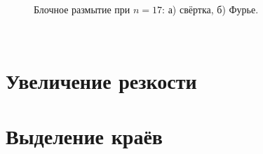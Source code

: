 \documentclass[a5paper, 10pt]{article}
\theoremstyle{definition}
\theoremstyle{plain}
\theoremstyle{remark}
\begin{document}
\begin{figure}[h!]
\begin{minipage}[h!]{0.47\linewidth}
\end{minipage}
\caption{Блочное размытие при $n= 17$: а) свёртка, б) Фурье.}
\end{figure}




\newpage
\,
\newpage
\section{Увеличение резкости}


\newpage
\section{Выделение краёв}
\end{document}
